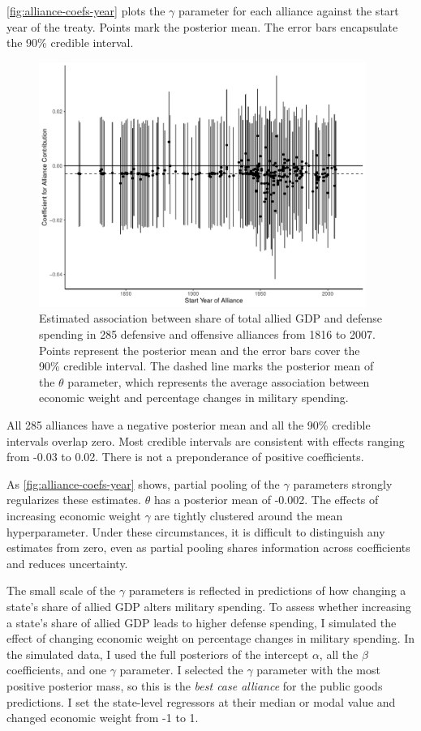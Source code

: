 \documentclass[12pt]{article}
\begin{document}
\autoref{fig:alliance-coefs-year} plots the $\gamma$ parameter for each alliance against the start year of the treaty.
Points mark the posterior mean. 
The error bars encapsulate the 90\% credible interval.


\begin{figure}[htbp]
	\centering
		\includegraphics[width=0.95\textwidth]{alliance-coefs-year.pdf}
	\caption{Estimated association between share of total allied GDP and defense spending in 285 defensive and offensive alliances from 1816 to 2007. Points represent the posterior mean and the error bars cover the 90\% credible interval. The dashed line marks the posterior mean of the $\theta$ parameter, which represents the average association between economic weight and percentage changes in military spending.}
	\label{fig:alliance-coefs-year}
\end{figure}


All 285 alliances have a negative posterior mean and all the 90\% credible intervals overlap zero. 
Most credible intervals are consistent with effects ranging from -0.03 to 0.02. 
There is not a preponderance of positive coefficients. 


As \autoref{fig:alliance-coefs-year} shows, partial pooling of the $\gamma$ parameters strongly regularizes these estimates. 
$\theta$ has a posterior mean of -0.002. 
The effects of increasing economic weight $\gamma$ are tightly clustered around the mean hyperparameter. 
Under these circumstances, it is difficult to distinguish any estimates from zero, even as partial pooling shares information across coefficients and reduces uncertainty. 


The small scale of the $\gamma$ parameters is reflected in predictions of how changing a state's share of allied GDP alters military spending. 
To assess whether increasing a state's share of allied GDP leads to higher defense spending, I simulated the effect of changing economic weight on percentage changes in military spending. 
In the simulated data, I used the full posteriors of the intercept $\alpha$, all the $\beta$ coefficients, and one $\gamma$ parameter. 
I selected the $\gamma$ parameter with the most positive posterior mass, so this is the \emph{best case alliance} for the public goods predictions. 
I set the state-level regressors at their median or modal value and changed economic weight from -1 to 1. 
\end{document}
